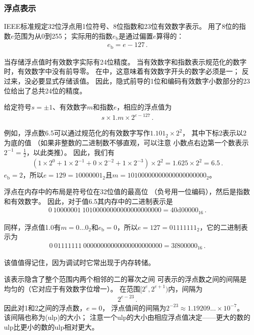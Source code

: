 \subsubsection*{浮点表示}
IEEE标准规定32位浮点用1位符号、8位指数和23位有效数字表示。
用了8位的指数$e$范围为从0到255；
实际用的指数$e_{\mathrm{b}}$是通过偏置$e$算得的：
\begin{align*}
    e_{\mathrm{b}}=e-127\, .
\end{align*}

当存储浮点值时有效数字实际有24位精度。
当有效数字和指数表示规范化的数字时，有效数字中没有前导零。
在中，这意味着有效数字开头的数字必须是一；
反过来，没必要显式存储该值。
因此，隐式前导的1位和编码有效数字小数部分的23位给出了总共24位的精度。

给定符号$s=\pm 1$、有效数字$m$和指数$e$，相应的浮点值为
\begin{align*}
    s\times 1.m\times2^{e-127}\, .
\end{align*}

例如，浮点数6.5可以通过规范化的有效数字写作$1.101_2\times2^2$，
其中下标2表示以2为底的值
（如果非整数的二进制数不够直观，可以注意
小数点右边第一个数表示$\displaystyle 2^{-1}=\frac{1}{2}$，以此类推）。
因此，我们有
\begin{align*}
    (1\times2^0+1\times2^{-1}+0\times2^{-2}+1\times2^{-3})\times2^2=1.625\times2^2=6.5\, .
\end{align*}
$e_{\mathrm{b}}=2$，所以$e=129=10000001_2$且$m=10100000000000000000000_2$。

浮点在内存中的布局是符号位在32位值的最高位
（负号用一位编码），然后是指数和有效数字。
因此，对于值6.5其内存中的二进制表示是
\begin{align*}
    0\ 10000001\ 10100000000000000000000=40\mathrm{d}00000_{16}\, .
\end{align*}

同样，浮点值1.0有$m=0\ldots0_2$和$e_{\mathrm{b}}=0$，所以$e=127=01111111_2$，它的二进制表示为
\begin{align*}
    0\ 01111111\ 00000000000000000000000=3\mathrm{f}800000_{16}\, .
\end{align*}

该值值得记住，因为调试时它常出现于内存转储。

该表示隐含了整个范围内两个相邻的二的幂次之间
可表示的浮点数之间的间隔是均匀的（它对应于有效数字位增一）。
在范围$[2^e,2^{e+1})$内，间隔为
\begin{align}\label{eq:3.6}
    2^{e-23}\, .
\end{align}
因此对1和2之间的浮点数，$e=0$，
浮点值间的间隔为$2^{-23}\approx1.19209\ldots\times10^{-7}$。
该间隔也称为(ulp)的大小；
注意一个ulp的大小由相应浮点值决定——更大的数的ulp比更小的数的ulp相对更大。

